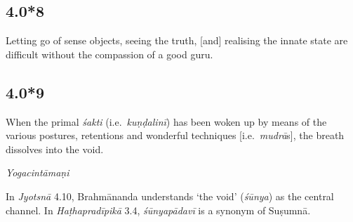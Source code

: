 \begin{ekdosis}
\subsection*{4.0*8}
\begin{translation}[hp04_000_8]
Letting go of sense objects, seeing the truth, [and] realising the innate state are difficult without the compassion of a good guru.
\end{translation}




\subsection*{4.0*9}
\begin{translation}[hp04_000_9]
When the primal \emph{śakti} (i.e.~\emph{kuṇḍalinī}) has been woken up by means of the various postures, retentions and wonderful techniques [i.e.~\emph{mudrā}s], the breath dissolves into the void.
\end{translation}


\begin{testimonia}[hp04_000_9]
\emph{Yogacintāmaṇi}
\begin{versinnote}
\end{versinnote}
\end{testimonia}

\begin{philcomm}[hp04_000_9]
In \emph{Jyotsnā} 4.10, Brahmānanda understands `the void' (\emph{śūnya}) as the central channel. In \emph{Haṭhapradīpikā} 3.4, \emph{śūnyapādavī} is a synonym of Suṣumnā.
\end{philcomm}


\end{ekdosis}
